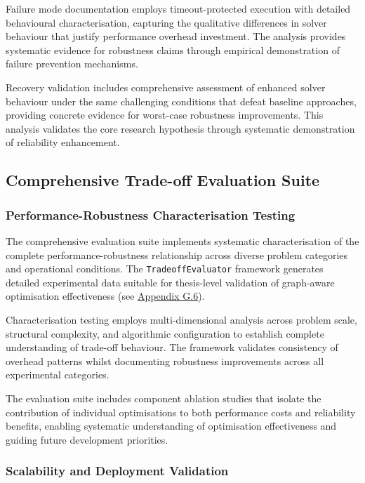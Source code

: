Failure mode documentation employs timeout-protected execution with detailed behavioural characterisation, capturing the qualitative differences in solver behaviour that justify performance overhead investment. The analysis provides systematic evidence for robustness claims through empirical demonstration of failure prevention mechanisms.

Recovery validation includes comprehensive assessment of enhanced solver behaviour under the same challenging conditions that defeat baseline approaches, providing concrete evidence for worst-case robustness improvements. This analysis validates the core research hypothesis through systematic demonstration of reliability enhancement.

\subsection{Comprehensive Trade-off Evaluation Suite}
\label{sec:comprehensive-tradeoff-evaluation}

\subsubsection{Performance-Robustness Characterisation Testing}
\label{sec:performance-robustness-characterisation}

The comprehensive evaluation suite implements systematic characterisation of the complete performance-robustness relationship across diverse problem categories and operational conditions. The \texttt{TradeoffEvaluator} framework generates detailed experimental data suitable for thesis-level validation of graph-aware optimisation effectiveness (see \hyperref[appendix:comprehensive-evaluation]{Appendix G.6}).

Characterisation testing employs multi-dimensional analysis across problem scale, structural complexity, and algorithmic configuration to establish complete understanding of trade-off behaviour. The framework validates consistency of overhead patterns whilst documenting robustness improvements across all experimental categories.

The evaluation suite includes component ablation studies that isolate the contribution of individual optimisations to both performance costs and reliability benefits, enabling systematic understanding of optimisation effectiveness and guiding future development priorities.

\subsubsection{Scalability and Deployment Validation}
\label{sec:scalability-deployment-validation}

